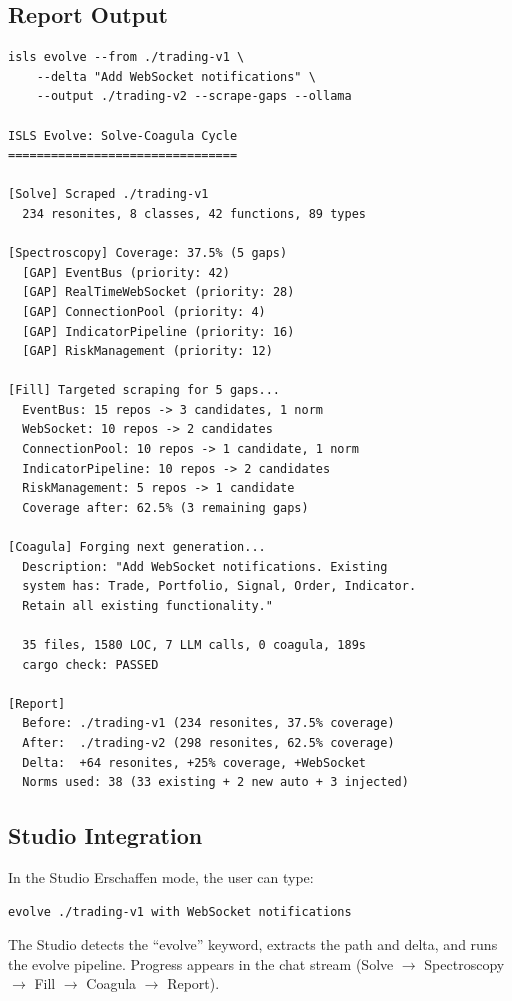 \documentclass[11pt,a4paper]{article}
\begin{document}
\subsection{Report Output}

\begin{lstlisting}[style=bash]
isls evolve --from ./trading-v1 \
    --delta "Add WebSocket notifications" \
    --output ./trading-v2 --scrape-gaps --ollama

ISLS Evolve: Solve-Coagula Cycle
================================

[Solve] Scraped ./trading-v1
  234 resonites, 8 classes, 42 functions, 89 types

[Spectroscopy] Coverage: 37.5% (5 gaps)
  [GAP] EventBus (priority: 42)
  [GAP] RealTimeWebSocket (priority: 28)
  [GAP] ConnectionPool (priority: 4)
  [GAP] IndicatorPipeline (priority: 16)
  [GAP] RiskManagement (priority: 12)

[Fill] Targeted scraping for 5 gaps...
  EventBus: 15 repos -> 3 candidates, 1 norm
  WebSocket: 10 repos -> 2 candidates
  ConnectionPool: 10 repos -> 1 candidate, 1 norm
  IndicatorPipeline: 10 repos -> 2 candidates
  RiskManagement: 5 repos -> 1 candidate
  Coverage after: 62.5% (3 remaining gaps)

[Coagula] Forging next generation...
  Description: "Add WebSocket notifications. Existing 
  system has: Trade, Portfolio, Signal, Order, Indicator.
  Retain all existing functionality."
  
  35 files, 1580 LOC, 7 LLM calls, 0 coagula, 189s
  cargo check: PASSED

[Report]
  Before: ./trading-v1 (234 resonites, 37.5% coverage)
  After:  ./trading-v2 (298 resonites, 62.5% coverage)
  Delta:  +64 resonites, +25% coverage, +WebSocket
  Norms used: 38 (33 existing + 2 new auto + 3 injected)
\end{lstlisting}

\subsection{Studio Integration}

In the Studio Erschaffen mode, the user can type:

\begin{lstlisting}[style=bash]
evolve ./trading-v1 with WebSocket notifications
\end{lstlisting}

The Studio detects the ``evolve'' keyword, extracts the 
path and delta, and runs the evolve pipeline. Progress 
appears in the chat stream (Solve $\to$ Spectroscopy $\to$ 
Fill $\to$ Coagula $\to$ Report).
\end{document}
